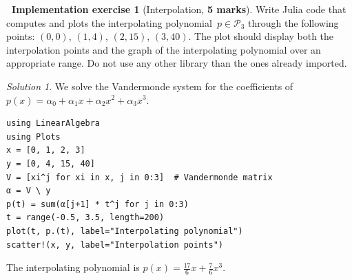\documentclass[10pt]{article}
\theoremstyle{definition}
\newtheorem{compexercise}{{\normalfont \faLaptop}~Implementation exercise}
\theoremstyle{remark}
\newtheorem*{protosolution}{Solution}
\renewcommand{\mymarks}[1]{\textbf{#1 marks}}
\newenvironment{solutionframe}
{%
    \begin{mdframed}[
        leftmargin=1cm,
        skipabove=.3cm,
        linecolor=blue,
        backgroundcolor=lightgreen,
        linewidth=0pt,
        innerleftmargin=.5em,
        innerrightmargin=.5em,
        innertopmargin=.3em,
        innerbottommargin=.6em,
    ]
}
{
    \end{mdframed}
}
\newenvironment{solution}
{\pushQED{\qed}\renewcommand{\qedsymbol}{$\triangle$}
\begin{solutionframe}\small \begin{protosolution}}
{\popQED\end{protosolution}\end{solutionframe}}
\begin{document}
\begin{compexercise}
    [Interpolation, \mymarks{5}]
    Write Julia code that computes and plots the interpolating polynomial~$p \in \mathcal P_3$ through the following points:
    $(0, 0)$, $(1, 4)$, $(2, 15)$, $(3, 40)$.
    The plot should display both the interpolation points and the graph of the interpolating polynomial over an appropriate range.
    Do not use any other library than the ones already imported.
\end{compexercise}

\begin{solution}
    We solve the Vandermonde system for the coefficients of $p(x) = \alpha_0 + \alpha_1 x + \alpha_2 x^2 + \alpha_3 x^3$.
    \begin{verbatim}
using LinearAlgebra
using Plots
x = [0, 1, 2, 3]
y = [0, 4, 15, 40]
V = [xi^j for xi in x, j in 0:3]  # Vandermonde matrix
α = V \ y
p(t) = sum(α[j+1] * t^j for j in 0:3)
t = range(-0.5, 3.5, length=200)
plot(t, p.(t), label="Interpolating polynomial")
scatter!(x, y, label="Interpolation points")
    \end{verbatim}
    The interpolating polynomial is $p(x) = \frac{17}{6} x + \frac{7}{6} x^3$.
\end{solution}
\end{document}
